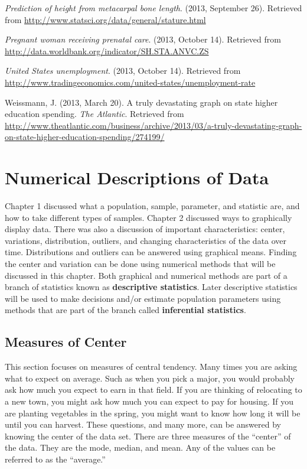 \documentclass[]{book}
\begin{document}
\emph{Prediction of height from metacarpal bone length}. (2013, September
26). Retrieved from \url{http://www.statsci.org/data/general/stature.html}

\emph{Pregnant woman receiving prenatal care}. (2013, October 14). Retrieved
from \url{http://data.worldbank.org/indicator/SH.STA.ANVC.ZS}

\emph{United States unemployment}. (2013, October 14). Retrieved from
\url{http://www.tradingeconomics.com/united-states/unemployment-rate}

Weissmann, J. (2013, March 20). A truly devastating graph on state
higher education spending. \emph{The Atlantic}. Retrieved from
\url{http://www.theatlantic.com/business/archive/2013/03/a-truly-devastating-graph-on-state-higher-education-spending/274199/}

\hypertarget{numerical-descriptions-of-data}{%
\chapter{Numerical Descriptions of Data}\label{numerical-descriptions-of-data}}

Chapter 1 discussed what a population, sample, parameter, and statistic are, and how to take different types of samples. Chapter 2 discussed ways to graphically display data. There was also a discussion of important characteristics: center, variations, distribution, outliers, and changing characteristics of the data over time. Distributions and outliers can be answered using graphical means. Finding the center and variation can be done using numerical methods that will be discussed in this chapter. Both graphical and numerical methods are part of a branch of statistics known as \textbf{descriptive statistics}. Later descriptive statistics will be used to make decisions and/or estimate population parameters using methods that are part of the branch called \textbf{inferential statistics}.

\hypertarget{measures-of-center}{%
\section{Measures of Center}\label{measures-of-center}}

This section focuses on measures of central tendency. Many times you are asking what to expect on average. Such as when you pick a major, you would probably ask how much you expect to earn in that field. If you are thinking of relocating to a new town, you might ask how much you can expect to pay for housing. If you are planting vegetables in the spring, you might want to know how long it will be until you can harvest. These questions, and many more, can be answered by knowing the center of the data set. There are three measures of the ``center'' of the data. They are the mode, median, and mean. Any of the values can be referred to as the ``average.''
\end{document}
